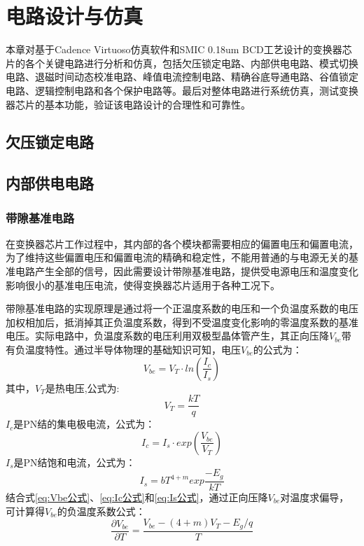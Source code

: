 \chapter{电路设计与仿真}

本章对基于Cadence Virtuoso仿真软件和SMIC 0.18um BCD工艺设计的变换器芯片的各个关键电路进行分析和仿真，包括欠压锁定电路、内部供电电路、模式切换电路、退磁时间动态校准电路、峰值电流控制电路、精确谷底导通电路、谷值锁定电路、逻辑控制电路和各个保护电路等。最后对整体电路进行系统仿真，测试变换器芯片的基本功能，验证该电路设计的合理性和可靠性。

\section{欠压锁定电路}




\section{内部供电电路}

\subsection{带隙基准电路}

在变换器芯片工作过程中，其内部的各个模块都需要相应的偏置电压和偏置电流，为了维持这些偏置电压和偏置电流的精确和稳定性，不能用普通的与电源无关的基准电路产生全部的信号，因此需要设计带隙基准电路，提供受电源电压和温度变化影响很小的基准电压电流，使得变换器芯片适用于各种工况下。

带隙基准电路的实现原理是通过将一个正温度系数的电压和一个负温度系数的电压加权相加后，抵消掉其正负温度系数，得到不受温度变化影响的零温度系数的基准电压。实际电路中，负温度系数的电压利用双极型晶体管产生，其正向压降$V_{be}$带有负温度特性。通过半导体物理的基础知识可知，电压$V_{be}$的公式为：
\begin{equation}
    \label{eq:Vbe公式}
    V_{be} = V_T \cdot ln(\frac{I_c}{I_s})
\end{equation}
其中，$V_T$是热电压,公式为:
\begin{equation}
    \label{eq:VT公式}
    V_T=\frac{kT}{q}
\end{equation}
$I_c$是PN结的集电极电流，公式为：
\begin{equation}
    \label{eq:Ic公式}
    I_c=I_s \cdot exp(\frac{V_{be}}{V_T})
\end{equation}
$I_s$是PN结饱和电流，公式为：
\begin{equation}
    \label{eq:Is公式}
    I_s=bT^{4+m} exp\frac{-E_g}{kT}
\end{equation}
结合式\eqref{eq:Vbe公式}、\eqref{eq:Ic公式}和\eqref{eq:Is公式}，通过正向压降$V_{be}$对温度求偏导，可计算得$V_{be}$的负温度系数公式：
\begin{equation}
    \label{eq:Vbe/T公式}
    \frac{\partial V_{be}}{\partial T} = \frac{ V_{be} - (4+m)V_T - E_g/q}{T}
\end{equation}

